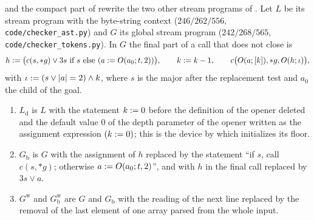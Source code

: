 and the compact part of  rewrite the
two other stream programs of . Let $L$ be its stream program
with the byte-string context ($246/262/556$, \texttt{code/checker\_ast.py}) and
$G$ its global stream program ($242/268/565$, \texttt{code/checker\_tokens.py}).
In $G$ the final part of a call that does not close is
\[
h\defeq\bigl(c(s,{*}g)\lor 3s\ \text{if}\ s\ \text{else}\ (a\defeq O(a_0;t,2))\bigr),\qquad
k\defeq k-1,\qquad c\bigl(O(a;[k]),{*}g,O(h;\iota)\bigr),
\]
with $\iota\mathrel{:=}(s\lor\lvert a\rvert=2)\land k$, where $s$ is the major after
the replacement test and $a_0$ the child of the goal.
\begin{enumerate}[label=(\alph*)]
\item $L_{\mathrm d}$ is $L$ with the statement $k\mathrel{:=} 0$ before the definition
of the opener deleted and the default value $0$ of the depth parameter of the
opener written as the assignment expression $(k\mathrel{:=} 0)$; this is the device
by which  initializes its floor.
\item $G_{\mathrm b}$ is $G$ with the assignment of $h$ replaced by the
statement ``if $s$, call $c(s,{*}g)$; otherwise $a\mathrel{:=} O(a_0;t,2)$'', and with
$h$ in the final call replaced by $3s\lor a$.
\item $G^{\mathrm w}$ and $G^{\mathrm w}_{\mathrm b}$ are $G$ and $G_{\mathrm b}$
with the reading of the next line replaced by the removal of the last element of
one array parsed from the whole input.
\end{enumerate}

